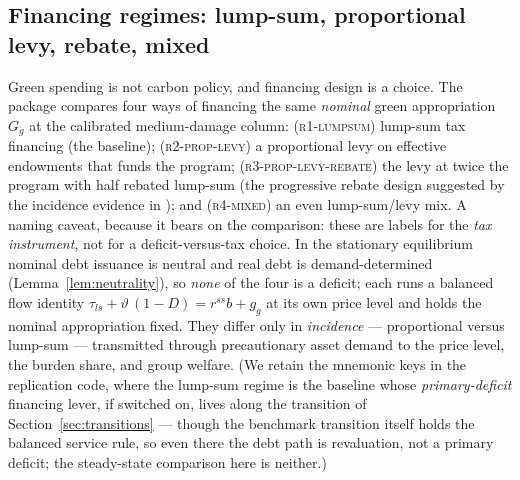 \documentclass[12pt]{article}
\begin{document}
\subsection{Financing regimes: lump-sum, proportional levy, rebate, mixed}
\label{subsec:regimes}

Green spending is not carbon policy, and financing design is a choice. The
package compares four ways of financing the same \emph{nominal} green
appropriation $G_g$ at the calibrated medium-damage column:
(\textsc{r1-lumpsum}) lump-sum tax
financing (the baseline); (\textsc{r2-prop-levy}) a proportional levy on
effective endowments that funds the program; (\textsc{r3-prop-levy-rebate})
the levy at twice the program with half rebated lump-sum (the progressive
rebate design suggested by the incidence evidence in
\citealp{kanzig2023carbon}); and (\textsc{r4-mixed}) an even
lump-sum/levy mix. A naming caveat, because it bears on the
comparison: these are labels for the \emph{tax instrument}, not for a
deficit-versus-tax choice. In the stationary equilibrium nominal debt
issuance is neutral and real debt is demand-determined
(Lemma~\ref{lem:neutrality}), so \emph{none} of the four is a deficit; each
runs a balanced flow identity $\tau_{ls} + \vartheta\,(1-D) = r^{ss} b + g_g$
at its own price level and holds the nominal appropriation fixed. They differ
only in \emph{incidence} --- proportional versus lump-sum --- transmitted
through precautionary asset demand to the price level, the burden share, and
group welfare. (We retain the mnemonic keys in the replication code, where
the lump-sum regime is the baseline whose \emph{primary-deficit} financing
lever, if switched on, lives along the transition of
Section~\ref{sec:transitions} --- though the benchmark transition itself holds
the balanced service rule, so even there the debt path is revaluation, not a
primary deficit; the steady-state comparison here is neither.)
\end{document}

